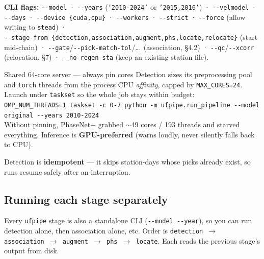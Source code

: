 \documentclass[11pt]{article}
\newcommand{\code}[1]{\texttt{#1}}
\begin{document}
\noindent\textbf{CLI flags:} \code{-{}-model} · \code{-{}-years} (\code{'2010-2024'} or \code{'2015,2016'}) ·
\code{-{}-velmodel} · \code{-{}-days} · \code{-{}-device \{cuda,cpu\}} · \code{-{}-workers} · \code{-{}-strict} ·
\code{-{}-force} (allow writing to \code{stead}) ·\\ \code{-{}-stage-from
\{detection,association,augment,phs,locate,relocate\}} (start mid-chain) ·
\code{-{}-gate}/\code{-{}-pick-match-tol}/\dots\ (association, \S4.2) ·
\code{-{}-qc}/\code{-{}-xcorr} (relocation, \S7) · \code{-{}-no-regen-sta} (keep an existing station file).

\begin{warnbox}{Shared 64-core server — always pin cores}
Detection sizes its preprocessing pool and \code{torch} threads from the process CPU \emph{affinity}, capped by
\code{MAX\_CORES=24}. Launch under \code{taskset} so the whole job stays within budget:\\[1mm]
\hspace*{3mm}\code{OMP\_NUM\_THREADS=1 taskset -c 0-7 python -m ufpipe.run\_pipeline -{}-model original -{}-years 2010-2024}\\[1mm]
Without pinning, PhaseNet+ grabbed $\sim$49 cores / 193 threads and starved everything. Inference is
\textbf{GPU-preferred} (warns loudly, never silently falls back to CPU).
\end{warnbox}

\noindent Detection is \textbf{idempotent} — it skips station-days whose picks already exist, so runs resume
safely after an interruption.

\subsection{Running each stage separately}
Every \code{ufpipe} stage is also a standalone CLI (\code{-{}-model -{}-year}), so you can run detection alone,
then association alone, etc. Order is \code{detection $\rightarrow$ association $\rightarrow$ augment
$\rightarrow$ phs $\rightarrow$ locate}. Each reads the previous stage's output from disk.
\end{document}
